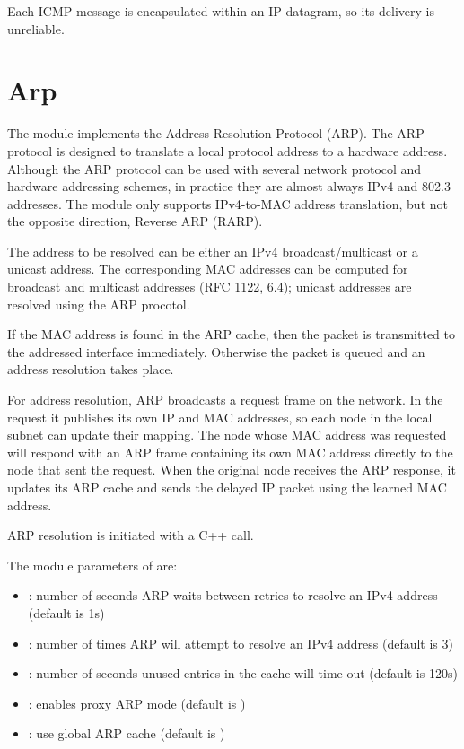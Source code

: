 Each ICMP message is encapsulated within an IP datagram, so its delivery
is unreliable.

\section{Arp}

The  module implements the Address Resolution Protocol (ARP).
The ARP protocol is designed to translate a local protocol address to a hardware
address. Although the ARP protocol can be used with several network protocol and
hardware addressing schemes, in practice they are almost always IPv4 and 802.3
addresses. The  module only supports IPv4-to-MAC address
translation, but not the opposite direction, Reverse ARP (RARP).

The address to be resolved can be either an IPv4 broadcast/multicast or a
unicast address. The corresponding MAC addresses can be computed for broadcast
and multicast addresses (RFC 1122, 6.4); unicast addresses are resolved 
using the ARP procotol.

If the MAC address is found in the ARP cache, then the packet is transmitted to
the addressed interface immediately. Otherwise the packet is queued and an
address resolution takes place.

For address resolution, ARP broadcasts a request frame on the network. In the
request it publishes its own IP and MAC addresses, so each node in the local
subnet can update their mapping. The node whose MAC address was requested will
respond with an ARP frame containing its own MAC address directly to the node
that sent the request. When the original node receives the ARP response, it
updates its ARP cache and sends the delayed IP packet using the learned MAC
address.

ARP resolution is initiated with a C++ call.

The module parameters of  are:

\begin{itemize}
  \item {}: number of seconds ARP waits between retries to resolve an IPv4 address (default is 1s)
  \item {}: number of times ARP will attempt to resolve an IPv4 address (default is 3)
  \item {}: number of seconds unused entries in the cache will time out (default is 120s)
  \item {}: enables proxy ARP mode (default is )
  \item {}: use global ARP cache (default is )
\end{itemize}


